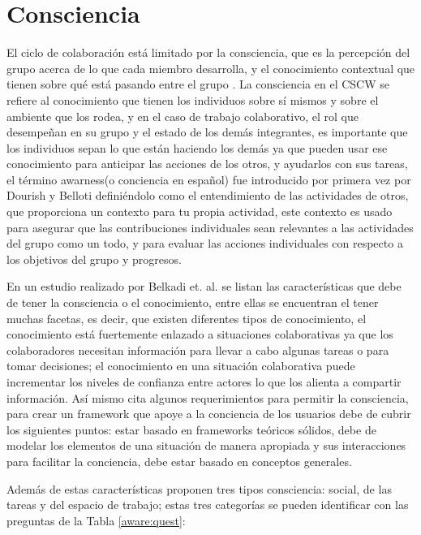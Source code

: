 \section{Consciencia}

El ciclo de colaboraci\'on est\'a limitado por la consciencia, que es la percepci\'on del grupo acerca de lo que cada miembro desarrolla, y el conocimiento contextual que tienen sobre qu\'e est\'a pasando entre el grupo \citep{mittleman2008toward}. La consciencia en el CSCW se refiere al conocimiento que tienen los individuos sobre s\'i mismos y sobre el ambiente que los rodea, y en el caso de trabajo colaborativo, el rol que desempe\~nan en su grupo y el estado de los dem\'as integrantes, es importante que los individuos sepan lo que est\'an haciendo los dem\'as ya que pueden usar ese conocimiento para anticipar las acciones de los otros, y ayudarlos con sus tareas\citep{gutwin1996supporting}, el t\'ermino awarness(o conciencia en espa\~nol) fue introducido por primera vez por Dourish y Belloti\citep{dourish1992awareness} defini\'endolo como el entendimiento de las actividades de otros, que proporciona un contexto para tu propia actividad, este contexto es usado para asegurar que las contribuciones individuales sean relevantes a las actividades del grupo como un todo, y para evaluar las acciones individuales con respecto a los objetivos del grupo y progresos. 


En un estudio realizado por Belkadi et. al. \citep{Belkadi2013110} se listan las caracter\'isticas que debe de tener la consciencia o el conocimiento, entre ellas se encuentran el tener muchas facetas, es decir, que existen diferentes tipos de conocimiento, el conocimiento est\'a fuertemente enlazado a situaciones colaborativas ya que los colaboradores necesitan informaci\'on para llevar a cabo algunas tareas o para tomar decisiones; el conocimiento en una situaci\'on colaborativa puede incrementar los niveles de confianza entre actores lo que los alienta a compartir informaci\'on. As\'i mismo cita algunos requerimientos para permitir la consciencia, para crear un framework que apoye a la conciencia de los usuarios debe de cubrir los siguientes puntos: estar basado en frameworks te\'oricos s\'olidos, debe de modelar los elementos de una situaci\'on de manera apropiada y sus interacciones para facilitar la conciencia, debe estar basado en conceptos generales.

Adem\'as de estas caracter\'isticas proponen tres tipos consciencia: social, de las tareas y del espacio de trabajo; estas tres categor\'ias se pueden identificar con las preguntas de la Tabla \ref{aware:quest}:

